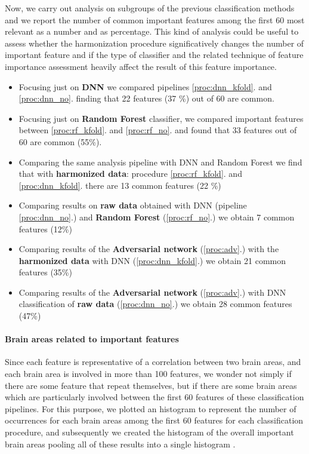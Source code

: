 \documentclass[10pt]{report}
\begin{document}
Now, we carry out analysis on subgroups of the previous classification methods and we report the number of common important features among the first 60 most relevant as a number and as percentage. This kind of analysis could be useful to assess whether the harmonization procedure significatively changes the number of important feature and if the type of classifier and the related technique of feature importance assessment heavily affect the result of this feature importance.

\begin{itemize}
\item Focusing just on \textbf{DNN} we compared pipelines \ref{proc:dnn_kfold}. and \ref{proc:dnn_no}. finding that 22 features (37 \%) out of 60 are common.
\item Focusing just on \textbf{Random Forest} classifier, we compared important features between \ref{proc:rf_kfold}. and \ref{proc:rf_no}. and found that 33 features out of 60 are common (55\%).
\item Comparing the same analysis pipeline with DNN and Random Forest we find that with \textbf{harmonized data}: procedure \ref{proc:rf_kfold}. and \ref{proc:dnn_kfold}. there are 13 common features (22 \%)
\item Comparing results on \textbf{raw data} obtained with DNN (pipeline \ref{proc:dnn_no}.) and \textbf{Random Forest} (\ref{proc:rf_no}.) we obtain 7 common features  (12\%)
\item Comparing results of the \textbf{Adversarial network} (\ref{proc:adv}.) with the \textbf{harmonized data} with DNN (\ref{proc:dnn_kfold}.) we obtain 21 common features (35\%)
\item Comparing results of the \textbf{Adversarial network} (\ref{proc:adv}.) with DNN classification of \textbf{raw data} (\ref{proc:dnn_no}.) we obtain 28 common features (47\%)
\end{itemize}



\paragraph{Brain areas related to important features} \hfill

Since each feature is representative of a correlation between two brain areas, and each brain area is involved in more than 100 features, we wonder not simply if there are some feature that repeat themselves, but if there are some brain areas which are particularly involved between the first 60 features of these classification pipelines.
For this purpose, we plotted an histogram to represent the number of occurrences for each brain areas among the first 60 features for each classification procedure, and subsequently we created the histogram of the overall important brain areas pooling all of these results into a single histogram .
\end{document}
